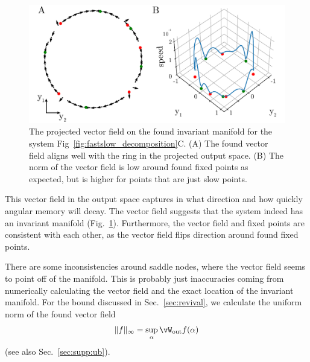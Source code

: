 \documentclass{article} %
\newcounter{ct}
\newcommand{\wout}{\vW_{\text{out}}}
\theoremstyle{definition}
\theoremstyle{remark}
\begin{document}
 \begin{figure}[tbhp]
     \centering
    \includegraphics[width=\textwidth]{vf_on_ring}
       \caption{The projected vector field on the found invariant manifold for the system Fig~\ref{fig:fastslow_decomposition}C.
       (A) The found vector field aligns well with the ring in the projected output space.
       (B) The norm of the vector field is low around found fixed points as expected, but is higher for points that are just slow points.
       }\label{fig:vf_on_ring}
\end{figure}

This vector field in the output space captures in what direction and how quickly angular memory will decay.
 The vector field  suggests that the system indeed has an invariant manifold (Fig.~\ref{fig:vf_on_ring}).
 Furthermore, the vector field and fixed points are consistent with each other, as the vector field flips direction around found fixed points.


 There are some inconsistencies around saddle nodes, where the vector field seems to point off of the manifold.
 This is probably just inaccuracies  coming from numerically calculating the vector field and the exact location of the invariant manifold.
%
For the bound discussed in Sec.~\ref{sec:revival}, we calculate the uniform norm of the found vector field \begin{equation}\|f\|_\infty = \sup_{\alpha} \wout f(\alpha)\end{equation} (see also Sec.~\ref{sec:supp:ub}).
\end{document}
